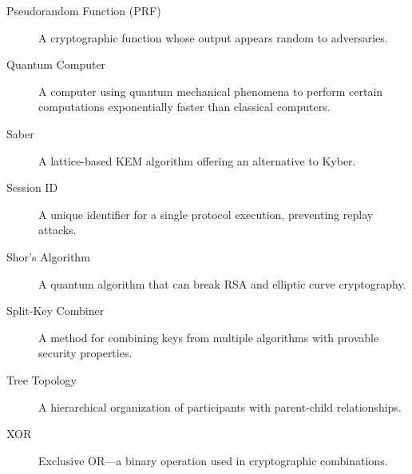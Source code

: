 \documentclass[12pt,a4paper]{report}
\begin{document}
\begin{description}
\item[Pseudorandom Function (PRF)] A cryptographic function whose output appears random to adversaries.

\item[Quantum Computer] A computer using quantum mechanical phenomena to perform certain computations exponentially faster than classical computers.

\item[Saber] A lattice-based KEM algorithm offering an alternative to Kyber.

\item[Session ID] A unique identifier for a single protocol execution, preventing replay attacks.

\item[Shor's Algorithm] A quantum algorithm that can break RSA and elliptic curve cryptography.

\item[Split-Key Combiner] A method for combining keys from multiple algorithms with provable security properties.

\item[Tree Topology] A hierarchical organization of participants with parent-child relationships.

\item[XOR] Exclusive OR—a binary operation used in cryptographic combinations.

\end{description}

\end{document}
